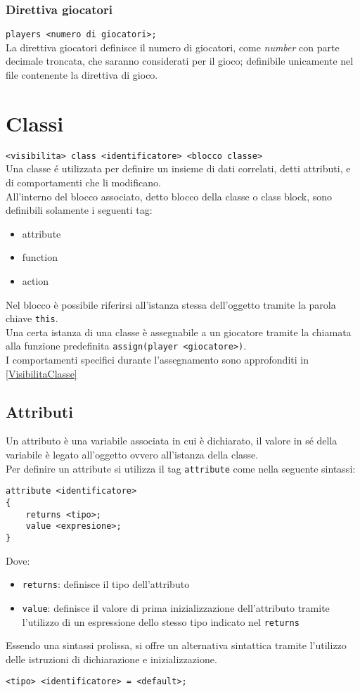 \subsubsection{Direttiva giocatori}
\lstinline|players <numero di giocatori>; | \\
La direttiva giocatori definisce il numero di giocatori, come \textit{number} con parte decimale troncata, 
che saranno considerati per il gioco; definibile unicamente nel file contenente la direttiva di gioco.

\section{Classi}
\lstinline|<visibilita> class <identificatore> <blocco classe>| \\
Una classe é utilizzata per definire un insieme di dati correlati, detti attributi, e di 
comportamenti che li modificano. \\
All'interno del blocco associato, detto blocco della classe o class block, sono definibili
solamente i seguenti tag:
\begin{itemize}
    \item attribute
    \item function
    \item action
\end{itemize}
Nel blocco è possibile riferirsi all'istanza stessa dell'oggetto tramite la parola chiave \lstinline|this|. \\
Una certa istanza di una classe è assegnabile a un giocatore tramite la chiamata alla funzione predefinita \lstinline|assign(player <giocatore>)|. \\
I comportamenti specifici durante l'assegnamento sono approfonditi in \ref*{VisibilitaClasse}

\subsection{Attributi}
Un attributo è una variabile associata in cui è dichiarato, il valore in sé della 
variabile è legato all'oggetto ovvero all'istanza della classe. \\
Per definire un attribute si utilizza il tag \lstinline|attribute| come nella seguente sintassi:
\begin{lstlisting}
attribute <identificatore>
{
    returns <tipo>;     
    value <expresione>;
}
\end{lstlisting}
Dove:
\begin{itemize}
    \item \lstinline|returns|: definisce il tipo dell'attributo
    \item \lstinline|value|: definisce il valore di prima inizializzazione dell'attributo tramite 
    l'utilizzo di un espressione dello stesso tipo indicato nel \lstinline|returns|
\end{itemize}
Essendo una sintassi prolissa, si offre un alternativa sintattica tramite l'utilizzo
delle istruzioni di dichiarazione e inizializzazione.
\begin{lstlisting}
<tipo> <identificatore> = <default>; 
\end{lstlisting}

